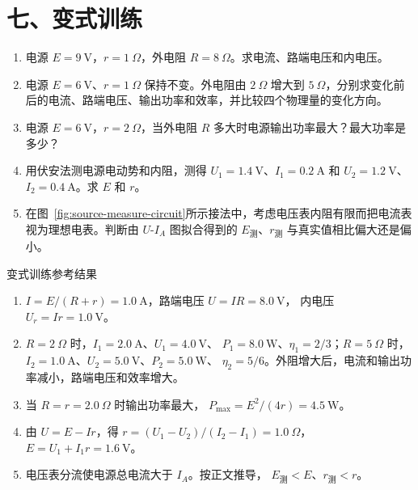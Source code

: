 \section*{七、变式训练}

\begin{enumerate}
  \item 电源 $E = 9\ \mathrm{V}$，$r = 1\ \Omega$，外电阻 $R = 8\ \Omega$。求电流、路端电压和内电压。
  \begin{center}
  
  \end{center}

  \item 电源 $E=6\ \mathrm V$、$r=1\ \Omega$ 保持不变。外电阻由 $2\ \Omega$ 增大到 $5\ \Omega$，分别求变化前后的电流、路端电压、输出功率和效率，并比较四个物理量的变化方向。

  \item 电源 $E = 6\ \mathrm{V}$，$r = 2\ \Omega$，当外电阻 $R$ 多大时电源输出功率最大？最大功率是多少？
  \begin{center}
  
  \end{center}

  \item 用伏安法测电源电动势和内阻，测得 $U_1 = 1.4\ \mathrm{V}$、$I_1 = 0.2\ \mathrm{A}$ 和 $U_2 = 1.2\ \mathrm{V}$、$I_2 = 0.4\ \mathrm{A}$。求 $E$ 和 $r$。

  \item 在图~\ref{fig:source-measure-circuit}所示接法中，考虑电压表内阻有限而把电流表视为理想电表。判断由 $U$-$I_A$ 图拟合得到的 $E_{\text{测}}$、$r_{\text{测}}$ 与真实值相比偏大还是偏小。
\end{enumerate}

\begin{learningbox}{变式训练参考结果}
\begin{enumerate}[itemsep=0.45em,topsep=0.3em,parsep=0pt]
  \item $I=E/(R+r)=1.0\ \mathrm A$，路端电压 $U=IR=8.0\ \mathrm V$，
  内电压 $U_r=Ir=1.0\ \mathrm V$。
  \item $R=2\ \Omega$ 时，$I_1=2.0\ \mathrm A$、$U_1=4.0\ \mathrm V$、
  $P_1=8.0\ \mathrm W$、$\eta_1=2/3$；$R=5\ \Omega$ 时，
  $I_2=1.0\ \mathrm A$、$U_2=5.0\ \mathrm V$、$P_2=5.0\ \mathrm W$、
  $\eta_2=5/6$。外阻增大后，电流和输出功率减小，路端电压和效率增大。
  \item 当 $R=r=2.0\ \Omega$ 时输出功率最大，
  $P_{\max}=E^2/(4r)=4.5\ \mathrm W$。
  \item 由 $U=E-Ir$，得
  $r=(U_1-U_2)/(I_2-I_1)=1.0\ \Omega$，
  $E=U_1+I_1r=1.6\ \mathrm V$。
  \item 电压表分流使电源总电流大于 $I_A$。按正文推导，
  $E_{\text{测}}<E$、$r_{\text{测}}<r$。
\end{enumerate}
\end{learningbox}

